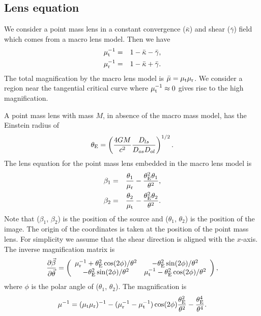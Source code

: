 \documentclass[showpacs,twocolumn,preprintnumbers,amsmath,amssymb,superscriptaddress,nofootinbib]{revtex4}
\begin{document}
\subsection{Lens equation}

We consider a point mass lens in a constant convergence
($\bar{\kappa}$) and shear ($\bar{\gamma}$) field which comes from a
macro lens model. Then we have
\begin{eqnarray}
\mu_{\rm t}^{-1}&=& 1-\bar{\kappa}-\bar{\gamma},\\
\mu_{\rm r}^{-1}&=& 1-\bar{\kappa}+\bar{\gamma}.
\end{eqnarray}
The total magnification by the macro lens model is $\bar{\mu}=\mu_{\rm
  t}\mu_{\rm r}$. We consider a region near the tangential critical
curve where $\mu_{\rm t}^{-1}\approx 0$ gives rise to the high
magnification. 

A point mass lens with mass $M$, in absence of the macro mass model,
has the Einstein radius of 
\begin{equation}
  \theta_{\rm E}=\left(\frac{4GM}{c^2}\frac{D_{ls}}{D_{os}D_{ol}}\right)^{1/2}.
\label{eq:einrad}
\end{equation}
The lens equation for the point mass lens embedded in the macro lens
model is 
\begin{eqnarray}
  \beta_1 & = &
  \frac{\theta_1}{\mu_{\rm r}}-\frac{\theta_{\rm E}^2\theta_1}{\theta^2},\label{eq:beta1}\\
  \beta_2 & = & \frac{\theta_2}{\mu_{\rm t}}-\frac{\theta_{\rm E}^2\theta_2}{\theta^2}.\label{eq:beta2}
\end{eqnarray}
Note that ($\beta_1$, $\beta_2$) is the position of the source and
($\theta_1$, $\theta_2$) is the position of the image. The origin of
the coordinates is taken at the position of the point mass lens. For
simplicity we assume that the shear direction is aligned with the $x$-axis. The
inverse magnification matrix is 
\begin{equation}
  \frac{\partial \vec{\beta}}{\partial \vec{\theta}}
=\left(
    \begin{array}{cc}
     \mu_{\rm r}^{-1}+\theta_{\rm E}^2\cos (2\phi)/\theta^2
    & -\theta_{\rm E}^2\sin (2\phi)/\theta^2 \\
      -\theta_{\rm E}^2\sin (2\phi)/\theta^2
    & \mu_{\rm t}^{-1} -\theta_{\rm E}^2\cos (2\phi)/\theta^2
    \end{array}
  \right),
\end{equation}
where $\phi$ is the polar angle of ($\theta_1$, $\theta_2$).
The magnification is
\begin{equation}
\mu^{-1}=(\mu_{\rm t}\mu_{\rm r})^{-1}-(\mu_{\rm r}^{-1}-\mu_{\rm
  t}^{-1})\cos(2\phi)\frac{\theta_{\rm E}^2}{\theta^2}-\frac{\theta_{\rm E}^4}{\theta^4}.
\end{equation}
\end{document}
